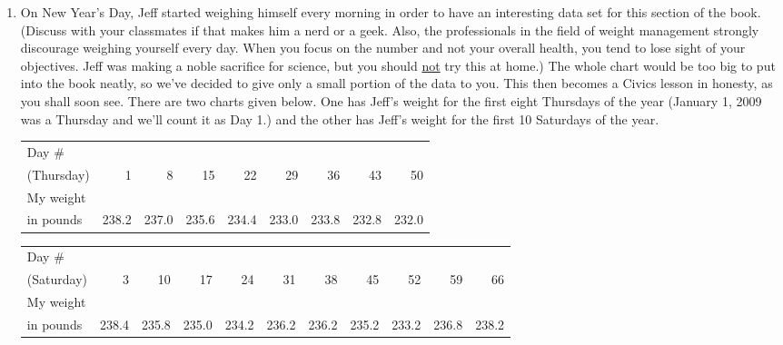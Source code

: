 \documentclass{ximera}
\begin{document}
\begin{enumerate}
\item On New Year's Day, Jeff started weighing himself every morning in order to have an interesting data set for this section of the book.  (Discuss with your classmates if that makes him a nerd or a geek.  Also, the professionals in the field of weight management strongly discourage weighing yourself every day.  When you focus on the number and not your overall health, you tend to lose sight of your objectives. Jeff was making a noble sacrifice for science, but you should \underline{not} try this at home.)  The whole chart would be too big to put into the book neatly, so we've decided to give only a small portion of the data to you.  This then becomes a Civics lesson in honesty, as you shall soon see.  There are two charts given below.  One has Jeff's weight for the first eight Thursdays of the year (January 1, 2009 was a Thursday and we'll count it as Day 1.) and the other has Jeff's weight for the first 10 Saturdays of the year.  

\medskip

\small

\noindent \begin{tabular}{|l|r|r|r|r|r|r|r|r|} \hline
Day \# & & & & & & & &  \\
(Thursday) & 1 & 8 & 15 & 22 & 29 & 36 & 43 & 50 \\ 
\hline 
My weight & & & & & & & & \\
in pounds & 238.2 & 237.0 & 235.6 & 234.4 & 233.0 & 233.8 & 232.8 & 232.0\\ \hline
\end{tabular}

\medskip

\noindent \begin{tabular}{|l|r|r|r|r|r|r|r|r|r|r|} \hline
Day \# & & & & & & & & & & \\
(Saturday) & 3 & 10 & 17 & 24 & 31 & 38 & 45 & 52 & 59 & 66 \\ 
\hline 
My weight & & & & & & & & & & \\
in pounds & 238.4 & 235.8 & 235.0 & 234.2 & 236.2 & 236.2 & 235.2 & 233.2 & 236.8 & 238.2\\ \hline
\end{tabular}

\normalsize

\medskip

\begin{enumerate}


\end{enumerate}
\end{enumerate}
\end{document}
